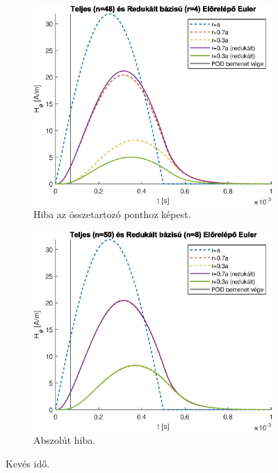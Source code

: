         \begin{figure}[h]
            \centering
            \begin{subfigure}{0.48\textwidth}
                \includegraphics[width=\textwidth]{kep/euler_0.07_4_td.eps}
                \caption{Hiba az összetartozó ponthoz képest.}
            \end{subfigure}
            \begin{subfigure}{0.48\textwidth}
                \includegraphics[width=\textwidth]{kep/euler_0.07_8_td.eps}
                \caption{Abszolút hiba.}
            \end{subfigure}
            \caption{Kevés idő.}
            \label{fig:keves_ido}
        \end{figure}
